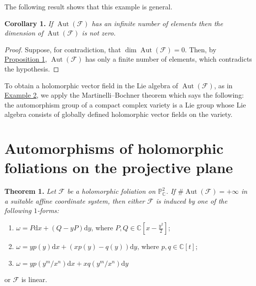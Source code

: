 \documentclass[british]{article}
\providecommand{\tightlist}{%
\setlength{\itemsep}{0pt}\setlength{\parskip}{0pt}}
\newenvironment{itenv}[1]
  {\phantomsection\par\smallskip\noindent\textbf{#1.}\itshape}
  {\par\smallskip}
\newcommand{\oldpage}[1]{\marginpar{\footnotesize$\Big\vert$ \textit{p.~#1}}}
\begin{document}
The following result shows that this example is general.

\protect{}\label{corollary-1}
\begin{itenv}{Corollary 1}
If \(\operatorname{Aut}({\mathcal{F}})\) has an infinite number of
elements then the dimension of \(\operatorname{Aut}({\mathcal{F}})\) is
not zero.

\end{itenv}

\begin{proof}
Suppose, for contradiction, that
\(\dim\operatorname{Aut}({\mathcal{F}})=0\). Then, by
\hyperref[proposition-1]{Proposition 1},
\(\operatorname{Aut}({\mathcal{F}})\) has only a finite number of
elements, which contradicts the hypothesis.
\end{proof}

To obtain a holomorphic vector field in the Lie algebra of
\(\operatorname{Aut}({\mathcal{F}})\), as in
\hyperref[example-2]{Example 2}, we apply the Martinelli--Bochner
theorem \autocite{10} which says the following: the automorphism group
of a compact complex variety is a Lie group whose Lie algebra consists
of globally defined holomorphic vector fields on the variety.

\section{Automorphisms of holomorphic foliations on the projective
plane}\label{section-3}

\oldpage{52}

\protect{}\label{theorem-1}
\begin{itenv}{Theorem 1}
Let \({\mathcal{F}}\) be a holomorphic foliation on
\(\mathbb{P}_\mathbb{C}^2\). If
\(\#\operatorname{Aut}({\mathcal{F}})=+\infty\) in a suitable affine
coordinate system, then either \({\mathcal{F}}\) is induced by one of
the following \(1\)-forms:

\begin{enumerate}
\def\labelenumi{\arabic{enumi}.}
\tightlist
\item
  \(\omega=P\mathrm{d}{x}+(Q-yP)\mathrm{d}{y}\), where
  \(P,Q\in\mathbb{C}[x-\frac{y^2}{2}]\);
\item
  \(\omega=yp(y)\mathrm{d}{x}+(xp(y)-q(y))\mathrm{d}{y}\), where
  \(p,q\in\mathbb{C}[t]\);
\item
  \(\omega=yp(y^m/x^n)\mathrm{d}{x}+xq(y^m/x^n)\mathrm{d}{y}\)
\end{enumerate}

or \({\mathcal{F}}\) is linear.

\end{itenv}
\end{document}
